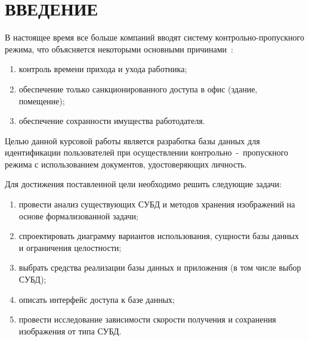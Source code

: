 \chapter*{ВВЕДЕНИЕ}

В настоящее время все больше компаний вводят систему контрольно-пропускного режима, что объясняется некоторыми основными причинами~\cite{introCPP}:
\begin{enumerate}
	\item контроль времени прихода и ухода работника;
	\item обеспечение только санкционированного доступа в офис (здание, помещение);
	\item обеспечение сохранности имущества работодателя.
\end{enumerate}

Целью данной курсовой работы является разработка базы данных для идентификации пользователей при осуществлении контрольно~-~пропускного режима с использованием документов, удостоверяющих личность.

Для достижения поставленной цели необходимо решить следующие задачи:
\begin{enumerate}
	\item провести анализ существующих СУБД и методов хранения изображений на основе формализованной задачи;
	\item спроектировать диаграмму вариантов использования, сущности базы данных и ограничения целостности;
	\item выбрать средства реализации базы данных и приложения (в том числе выбор СУБД);
	\item описать интерфейс доступа к базе данных;
	\item провести исследование зависимости скорости получения и сохранения изображения от типа СУБД.
\end{enumerate}